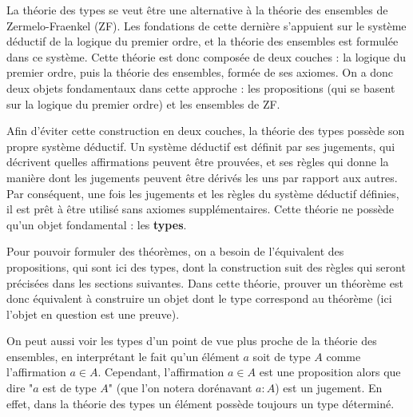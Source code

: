 \documentclass[../../rapport.tex]{subfiles}
\begin{document}
  La théorie des types se veut être une alternative à la théorie des ensembles de Zermelo-Fraenkel (ZF).
  Les fondations de cette dernière s'appuient sur le système déductif de la logique du premier ordre,
  et la théorie des ensembles est formulée dans ce système.
  Cette théorie est donc composée de deux couches :
  la logique du premier ordre, puis la théorie des ensembles, formée de ses axiomes.
  On a donc deux objets fondamentaux dans cette approche :
  les propositions (qui se basent sur la logique du premier ordre) et les ensembles de ZF.


  Afin d'éviter cette construction en deux couches, la théorie des types possède son propre système déductif.
  Un système déductif est définit par ses jugements, qui décrivent quelles affirmations peuvent être prouvées,
  et ses règles qui donne la manière dont les jugements peuvent être dérivés les uns par rapport aux autres.
  Par conséquent, une fois les jugements et les règles du système déductif définies,
  il est prêt à être utilisé sans axiomes supplémentaires.
  Cette théorie ne possède qu'un objet fondamental : les \textbf{types}.

  Pour pouvoir formuler des théorèmes, on a besoin de l'équivalent des propositions,
  qui sont ici des types, dont la construction suit des règles qui seront précisées dans les sections suivantes.
  Dans cette théorie, prouver un théorème est donc équivalent à construire un objet
  dont le type correspond au théorème (ici l'objet en question est une preuve).

  On peut aussi voir les types d'un point de vue plus proche de la théorie des ensembles,
  en interprétant le fait qu'un élément $a$ soit de type $A$ comme l'affirmation $a \in A$.
  Cependant, l'affirmation $a \in A$ est une proposition alors que dire "$a$ est de type $A$"
  (que l'on notera dorénavant $a : A$) est un jugement.
  En effet, dans la théorie des types un élément possède toujours un type déterminé.
\end{document}
